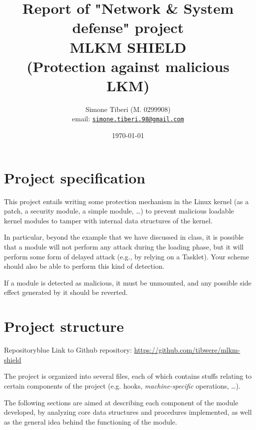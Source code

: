 \documentclass{article}
\title{\small Report of "Network \& System defense" project \\
\Huge \textbf{MLKM SHIELD}\\
\Large (Protection against malicious LKM)}
\author{Simone Tiberi (M. 0299908)\\%
email: \texttt{\href{mailto:simone.tiberi.98@gmail.com}{simone.tiberi.98@gmail.com}}}
\date{\today}
\begin{document}
	\maketitle
	\tableofcontents
	\newpage

	\section{Project specification}
	This project entails writing some protection mechanism in the Linux kernel (as a patch, a security module, a simple
	module, \dots) to prevent malicious loadable kernel modules to tamper with internal data structures of the kernel.

	In particular, beyond the example that we have discussed in class, it is possible that a module will not perform
	any attack during the loading phase, but it will perform some form of delayed attack (e.g., by relying on a
	Tasklet). Your scheme should also be able to perform this kind of detection.

	If a module is detected as malicious, it must be unmounted, and any possible side effect generated by it should be
	reverted.

	\section{Project structure}
	\begin{custombox}{Repository}{blue}
		Link to Github repository: \url{https://github.com/tibwere/mlkm-shield}
	\end{custombox}

	The project is organized into several files, each of which contains stuffs relating to certain components of the
	project (e.g. hooks, \textit{machine-specific} operations, \dots).

	The following sections are aimed at describing each component of the module developed, by analyzing core data
	structures and procedures implemented, as well as the general idea behind the functioning of the module.
\end{document}
